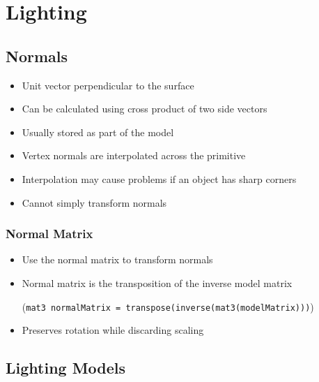 \documentclass[a4paper]{article}
\begin{document}
\section{Lighting}

\subsection{Normals}

\begin{itemize}
  \item
    Unit vector perpendicular to the surface

  \item
    Can be calculated using cross product of two side vectors

  \item
    Usually stored as part of the model

  \item
    Vertex normals are interpolated across the primitive

  \item
    Interpolation may cause problems if an object has sharp corners

  \item
    Cannot simply transform normals

\end{itemize}

\subsubsection{Normal Matrix}

\begin{itemize}
  \item
    Use the normal matrix to transform normals

  \item
    Normal matrix is the transposition of the inverse model matrix

    (\texttt{mat3 normalMatrix = transpose(inverse(mat3(modelMatrix)))})

  \item
    Preserves rotation while discarding scaling

\end{itemize}

\subsection{Lighting Models}
\end{document}
